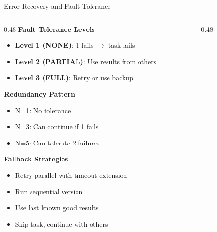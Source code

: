 \documentclass[aspectratio=169,11pt]{beamer}
\begin{document}
\begin{frame}{Error Recovery and Fault Tolerance}
    \begin{columns}[T]
        \begin{column}{0.48\textwidth}
            \textbf{Fault Tolerance Levels}
            \begin{itemize}
                \item \textbf{Level 1 (NONE)}: 1 fails $\rightarrow$ task fails
                \item \textbf{Level 2 (PARTIAL)}: Use results from others
                \item \textbf{Level 3 (FULL)}: Retry or use backup
            \end{itemize}

            \vspace{0.2cm}
            \textbf{Redundancy Pattern}
            \begin{itemize}
                \footnotesize
                \item N=1: No tolerance
                \item N=3: Can continue if 1 fails
                \item N=5: Can tolerate 2 failures
            \end{itemize}

            \vspace{0.2cm}
            \textbf{Fallback Strategies}
            \begin{itemize}
                \footnotesize
                \item Retry parallel with timeout extension
                \item Run sequential version
                \item Use last known good results
                \item Skip task, continue with others
            \end{itemize}
        \end{column}
        \begin{column}{0.48\textwidth}
\end{column}
\end{columns}
\end{frame}
\end{document}
